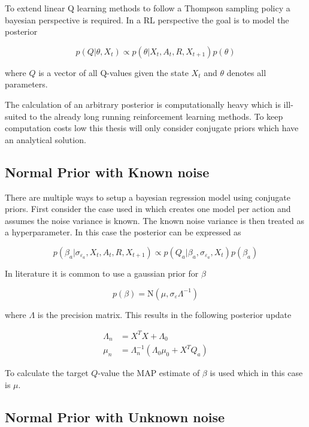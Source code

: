To extend linear Q learning methods to follow a Thompson sampling policy a bayesian perspective is required. In a RL perspective the goal is to model the posterior

\begin{equation*}
p(Q|\theta, X_{t}) \propto p(\theta|X_{t}, A_{t}, R, X_{t+1})p(\theta)
\end{equation*}

where $Q$ is a vector of all Q-values given the state $X_t$ and $\theta$ denotes all parameters.

The calculation of an arbitrary posterior is computationally heavy which is ill-suited to the already long running reinforcement learning methods. To keep computation costs low this thesis will only consider conjugate priors which have an analytical solution.

\subsection{Normal Prior with Known noise}

There are multiple ways to setup a bayesian regression model using conjugate priors. First consider the case used in \cite{azziz_2018} which creates one model per action and assumes the noise variance is known. The known noise variance is then treated as a hyperparameter. In this case the posterior can be expressed as 

$$
p(\beta_a|\sigma_{\varepsilon_a}, X_{t}, A_{t}, R, X_{t+1}) \propto p(Q_a|\beta_a, \sigma_{\varepsilon_a}, X_{t})p(\beta_a)
$$

In literature it is common to use a gaussian prior for $\beta$

$$
	  p(\beta) = \text{N}(\mu, \sigma_\varepsilon\Lambda^{-1}) 
$$

where $\Lambda$ is the precision matrix. This results in the following posterior update

\begin{align*}
	\Lambda_n & = X^TX + \Lambda_0 \\
	\mu_n     & = \Lambda_n^{-1}(\Lambda_0\mu_0 + X^TQ_a)
\end{align*}

To calculate the target $Q$-value the MAP estimate of $\beta$ is used which in this case is $\mu$. 

\subsection{Normal Prior with Unknown noise}

